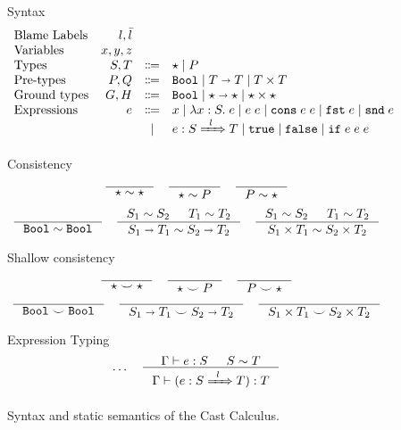 \documentclass[runningheads]{llncs}
\newcommand{\infr}[2]{\inference{#1}{#2}}
\newcommand{\stxrule}[3]{\text{#2} & #1 & \Coloneqq & #3\\}
\newcommand{\stxrulecont}[1]{& & | & #1 \\}
\newcommand{\Tdyn}[0]{\ensuremath{\star}}
\newcommand{\Pbool}[0]{\ensuremath{\mathtt{Bool}}}
\newcommand{\Pfunc}[2]{\ensuremath{#1 \shortrightarrow #2}}
\newcommand{\Pprod}[2]{\ensuremath{#1 \times #2}}
\newcommand{\Gbool}[0]{\Pbool}
\newcommand{\Gfunc}[0]{\Pfunc{\Tdyn}{\Tdyn}}
\newcommand{\Gprod}[0]{\Pprod{\Tdyn}{\Tdyn}}
\newcommand{\evar}[1]{#1}
\newcommand{\elam}[3]{\lambda#1:#2.\;#3}
\newcommand{\eapp}[2]{#1\;#2}
\newcommand{\etrue}[0]{\mathtt{true}}
\newcommand{\efalse}[0]{\mathtt{false}}
\newcommand{\eif}[3]{\mathtt{if}\;#1\;#2\;#3}
\newcommand{\econs}[2]{\mathtt{cons} \; #1 \; #2}
\newcommand{\efst}[1]{\mathtt{fst} \; #1}
\newcommand{\esnd}[1]{\mathtt{snd} \; #1}
\newcommand{\ecast}[2]{\ensuremath{#1 : #2}}
\newcommand{\ccast}[3]{#1 \xRightarrow[]{\enskip #2 \enskip} #3}
\newcommand{\consistent}[2]{\ensuremath{#1\sim#2}}
\newcommand{\shallowlyconsistent}[2]{\ensuremath{#1\smile#2}}
\newcommand{\expressiontyping}[3]{\ensuremath{#1 \vdash #2 : #3}}
\begin{document}
\begin{figure}
Syntax
\[
\begin{array}{lrcl}
\text{Blame Labels} & l,\bar{l} \\
\text{Variables} & x,y,z \\
\stxrule{S,T}{Types}{
	\Tdyn \mid{}
	P
}
\stxrule{P,Q}{Pre-types}{
	\Pbool \mid
	\Pfunc{T}{T} \mid
	\Pprod{T}{T}
}
\stxrule{G,H}{Ground types}{
	\Gbool  \mid
	\Gfunc  \mid
	\Gprod
}
\stxrule{e}{Expressions}{
	\evar{x}        \mid
	\elam{x}{S}{e}  \mid
	\eapp{e}{e}     \mid
	\econs{e}{e}  \mid
	\efst{e}      \mid
	\esnd{e}
}
\stxrulecont{
	\ecast{e}{\ccast{S}{l}{T}}  \mid
	\etrue         \mid
	\efalse        \mid
	\eif{e}{e}{e}
}
\end{array}
\]
	
	\fbox{\consistent{T}{T}} Consistency
	\begin{gather*}
	\infr{}{\consistent{\Tdyn}{\Tdyn}} \quad
	\infr{}{\consistent{\Tdyn}{P}    } \quad
	\infr{}{\consistent{P}{\Tdyn}    }
	\\[1ex]
	\infr{}{
		\consistent{\Pbool}{\Pbool}
	} \quad
	\infr{
		\consistent{S_1}{S_2} &
		\consistent{T_1}{T_2}
	}{
		\consistent{\Pfunc{S_1}{T_1}}{\Pfunc{S_2}{T_2}}
	} \quad
	\infr{
		\consistent{S_1}{S_2} &
		\consistent{T_1}{T_2}
	}{
		\consistent{\Pprod{S_1}{T_1}}{\Pprod{S_2}{T_2}}
	}
	\end{gather*}
		
	\fbox{\shallowlyconsistent{T}{T}} Shallow consistency
	\begin{gather*}
	\inference{}{
		\shallowlyconsistent{\Tdyn}{\Tdyn}
	} \quad
	\inference{}{
		\shallowlyconsistent{\Tdyn}{P}
	} \quad
	\inference{}{
		\shallowlyconsistent{P}{\Tdyn}
	} \\
	\inference{}{
		\shallowlyconsistent{\Pbool}{\Pbool}
	} \quad
	\inference{}{
		\shallowlyconsistent{\Pfunc{S_1}{T_1}}{\Pfunc{S_2}{T_2}}
	} \quad
	\inference{}{
		\shallowlyconsistent{\Pprod{S_1}{T_1}}{\Pprod{S_2}{T_2}}
	}
	\end{gather*}


\fbox{$\expressiontyping{\Gamma}{e}{T}$} Expression Typing
\begin{gather*}
\dots \quad
\infr{
	\expressiontyping{\Gamma}{e}{S}  &
	\consistent{S}{T}
}{
	\expressiontyping{\Gamma}{(\ecast{e}{\ccast{S}{l}{T}})}{T}
}
\end{gather*}

\caption{Syntax and static semantics of the Cast Calculus.}
\label{fig:statics}
\end{figure}
\end{document}
